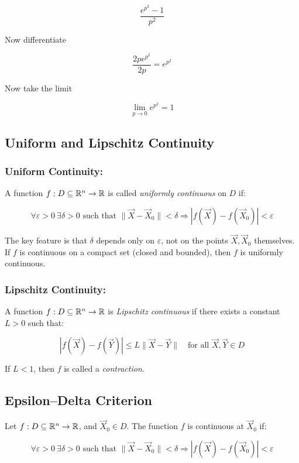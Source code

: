 \[
    \frac{e^{p^2} - 1}{p^2}
\]

Now differentiate

\[
    \frac{2p e^{p^2} }{2p} = e^{p^2}
\]

Now take the limit

\[
    \lim_{p \to 0} e^{p^2} = 1
\]

\subsection{Uniform and Lipschitz Continuity}

\subsubsection{Uniform Continuity:}  
A function \( f : D \subseteq \mathbb{R}^n \to \mathbb{R} \) is called \emph{uniformly continuous} on 
\( D \) if:

\[
    \forall \varepsilon > 0 \ \exists \delta > 0 \text{ such that } \|\vec{X} - \vec{X}_0\| < \delta 
    \Rightarrow |f(\vec{X}) - f(\vec{X}_0)| < \varepsilon
\]

The key feature is that \( \delta \) depends only on \( \varepsilon \), not on the points 
\( \vec{X}, \vec{X}_0 \) themselves.  
If \( f \) is continuous on a compact set (closed and bounded), then \( f \) is uniformly continuous.

\subsubsection{Lipschitz Continuity:}  

A function \( f : D \subseteq \mathbb{R}^n \to \mathbb{R} \) is \emph{Lipschitz continuous} if there 
exists a constant \( L > 0 \) such that:

\[
    |f(\vec{X}) - f(\vec{Y})| \le L \|\vec{X} - \vec{Y}\| \quad \text{for all } \vec{X}, \vec{Y} \in D
\]

If \( L < 1 \), then \( f \) is called a \emph{contraction}.

\subsection{Epsilon–Delta Criterion}

Let \( f : D \subseteq \mathbb{R}^n \to \mathbb{R} \), and \( \vec{X}_0 \in D \). The function 
\( f \) is continuous at \( \vec{X}_0 \) if:

\[
    \forall \varepsilon > 0 \ \exists \delta > 0 \text{ such that } \|\vec{X} - \vec{X}_0\| 
    < \delta \Rightarrow |f(\vec{X}) - f(\vec{X}_0)| < \varepsilon
\]

